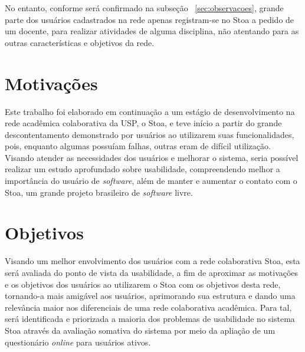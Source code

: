     No entanto, conforme será confirmado na subseção ~\ref{sec:observacoes}, grande parte dos usuários cadastrados na rede apenas registram-se no Stoa a pedido de um docente, para realizar atividades de alguma disciplina, não atentando para as outras características e objetivos da rede.
    


\section{Motivações}
\label{sec:motivos}

    Este trabalho foi elaborado em continuação a um estágio de desenvolvimento na rede acadêmica colaborativa da USP, o Stoa, e teve início a partir do grande descontentamento demonstrado por usuários ao utilizarem suas funcionalidades, pois, enquanto algumas possuíam falhas, outras eram de difícil utilização. Visando atender as necessidades dos usuários e melhorar o sistema, seria possível realizar um estudo aprofundado sobre usabilidade, compreendendo melhor a importância do usuário de \emph{software}, além de manter e aumentar o contato com o Stoa, um grande projeto brasileiro de \emph{software} livre. 
    
    



\section{Objetivos}
\label{sec:objetivo}

    Visando um melhor envolvimento dos usuários com a rede colaborativa Stoa, esta será avaliada do ponto de vista da usabilidade, a fim de aproximar as motivações e os objetivos dos usuários ao utilizarem o Stoa com os objetivos desta rede, tornando-a mais amigável aos usuários, aprimorando sua estrutura e dando uma relevância maior aos diferenciais de uma rede colaborativa acadêmica. Para tal, será identificada e priorizada a maioria dos problemas de usabilidade no sistema Stoa através da avaliação somativa do sistema por meio da apliação de um questionário \emph{online} para usuários ativos. 
    
